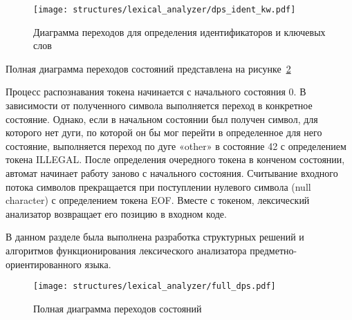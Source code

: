 \begin{figure}[ht]
	\centering
	\vspace{\toppaddingoffigure}
	\texttt{[image: structures/lexical\_analyzer/dps\_ident\_kw.pdf]}
	\caption{Диаграмма переходов для определения идентификаторов и ключевых слов}
	\label{f:dps_ident_kw}
\end{figure}

Полная диаграмма переходов состояний представлена на рисунке~\ref{f:full_dps}

Процесс распознавания токена начинается с начального состояния 0.
В зависимости от полученного символа выполняется переход в конкретное состояние.
Однако, если в начальном состоянии был получен символ, для которого нет дуги,
по которой он бы мог перейти в определенное для него состояние, выполняется переход по дуге «other» в состояние 42 с определением токена ILLEGAL.
После определения очередного токена в конченом состоянии, автомат начинает работу заново с начального состояния.
Считывание входного потока символов прекращается при поступлении нулевого символа (null character) с определением токена EOF.
Вместе с токеном, лексический анализатор возвращает его позицию в входном коде.

В данном разделе была выполнена разработка структурных решений и алгоритмов функционирования лексического анализатора предметно-ориентированного языка.

\clearpage

\begin{figure}[h!]
	\centering
	\vspace{\toppaddingoffigure}
	\texttt{[image: structures/lexical\_analyzer/full\_dps.pdf]}
	\caption{Полная диаграмма переходов состояний}
	\label{f:full_dps}
\end{figure}

\clearpage